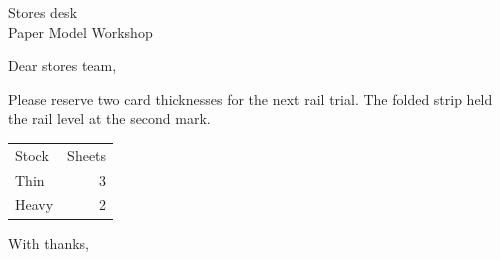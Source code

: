 \documentclass{letter}
\begin{document}
\begin{letter}{Stores desk\\Paper Model Workshop}\opening{Dear stores team,}
Please reserve two card thicknesses for the next rail trial. The folded strip held the rail level at the second mark.
\begin{center}\begin{tabular}{lr}Stock&Sheets\\Thin&3\\Heavy&2\end{tabular}\end{center}
\closing{With thanks,}\end{letter}
\end{document}
